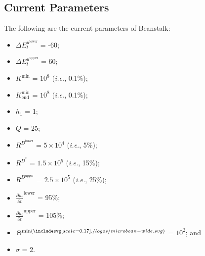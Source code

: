 \documentclass[class=article, crop=false]{standalone}
\begin{document}

\subsection{Current Parameters}

The following are the current parameters of Beanstalk:

\begin{itemize}[itemsep=3pt,leftmargin=16pt]
    \item $\Delta E_{t}^{u^{\text{lower}}}$ = -60;
    \item $\Delta E_{t}^{u^{\text{upper}}}$ = 60;
    \item \hyperlink{ht119}{$K^{\text{min}}$} = $10^8$ (\textit{i.e.}, 0.1\%);
    \item $K_{\text{end}}^{\text{min}}$ = $10^8$ (\textit{i.e.}, 0.1\%);
    \item $h_1$ = 1;
    \item $Q$ = 25;
    \item $R^{D^{\text{lower}}}$ = $5 \times 10^4$ (\textit{i.e.}, 5\%);
    \item $R^{D^*}$ = $1.5 \times 10^5$ (\textit{i.e.}, 15\%);
    \item $R^{D^{\text{upper}}}$ = $2.5 \times 10^5$ (\textit{i.e.}, 25\%);
    \item $\frac{\partial u_t}{\partial t}^{\text{lower}}$ = 95\%;
    \item $\frac{\partial u_t}{\partial t}^{\text{upper}}$ = 105\%;
    \item $\Theta^{\text{min}(\bean)}$ = $10^2$; and
    \item $\sigma$ = 2.
\end{itemize}
\end{document}
